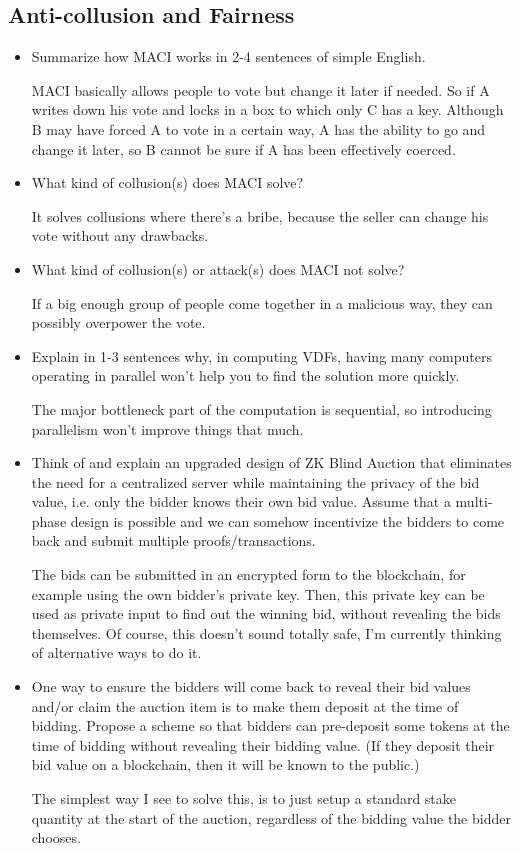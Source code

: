 \documentclass{article}
\begin{document}
\subsection*{Anti-collusion and Fairness}
\begin{itemize}
    \item Summarize how MACI works in 2-4 sentences of simple English. \par MACI basically allows people to vote but change it later if needed. So if A writes down his vote and locks in a box to which only C has a key. Although B may have forced A to vote in a certain way, A has the ability to go and change it later, so B cannot be sure if A has been effectively coerced.
    \item What kind of collusion(s) does MACI solve? \par It solves collusions where there's a bribe, because the seller can change his vote without any drawbacks.
    \item What kind of collusion(s) or attack(s) does MACI not solve? \par If a big enough group of people come together in a malicious way, they can possibly overpower the vote.
    \item Explain in 1-3 sentences why, in computing VDFs, having many computers operating in parallel won't help you to find the solution more quickly. \par The major bottleneck part of the computation is sequential, so introducing parallelism won't improve things that much.
    \item Think of and explain an upgraded design of ZK Blind Auction that eliminates the need for a centralized server while maintaining the privacy of the bid value, i.e. only the bidder knows their own bid value. Assume that a multi-phase design is possible and we can somehow incentivize the bidders to come back and submit multiple proofs/transactions. \par The bids can be submitted in an encrypted form to the blockchain, for example using the own bidder's private key. Then, this private key can be used as private input to find out the winning bid, without revealing the bids themselves. Of course, this doesn't sound totally safe, I'm currently thinking of alternative ways to do it.
    \item One way to ensure the bidders will come back to reveal their bid values and/or claim the auction item is to make them deposit at the time of bidding. Propose a scheme so that bidders can pre-deposit some tokens at the time of bidding without revealing their bidding value. (If they deposit their bid value on a blockchain, then it will be known to the public.) \par The simplest way I see to solve this, is to just setup a standard stake quantity at the start of the auction, regardless of the bidding value the bidder chooses.
\end{itemize}
\end{document}
